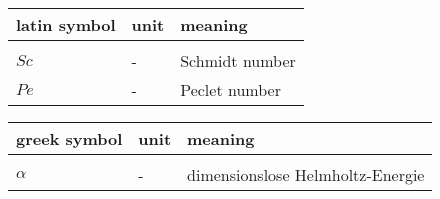 \documentclass[../thesis.tex]{subfiles}
\begin{document}
	

\renewcommand*{\arraystretch}{1.2}
\small
\begin{tabular}{p{4cm}p{3cm}p{8cm}}
	latin symbol & unit & meaning \\ 
	\hline \\[\dimexpr-\normalbaselineskip+2pt]
	$Sc$ & - & Schmidt number \\
	$Pe$ & - & Peclet number \\
\end{tabular}
\vspace{1cm}

\small
\begin{tabular}{p{4cm}p{3cm}p{8cm}}
	greek symbol & unit & meaning \\
	\hline \\[\dimexpr-\normalbaselineskip+2pt] 
	$\alpha$ & - & dimensionslose Helmholtz-Energie \\
\end{tabular}

\listoffigures
\listoftables
\end{document}
